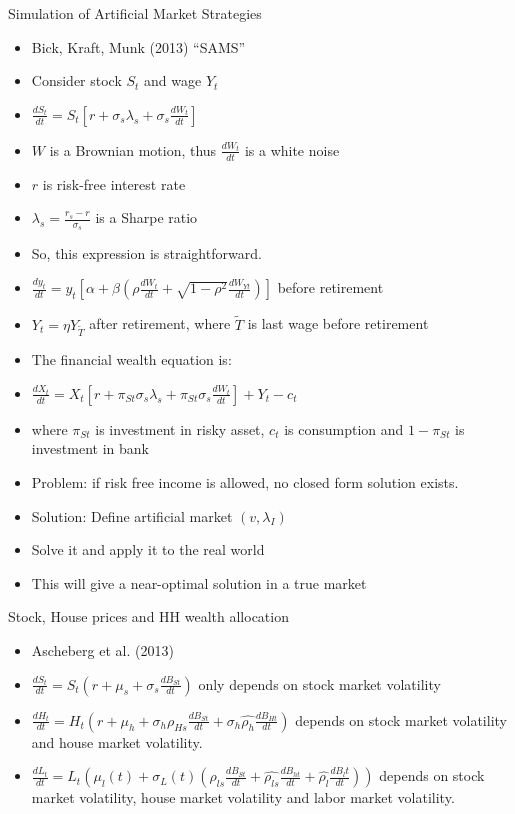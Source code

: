 \documentclass{beamer}
\begin{document}
\begin{frame}[allowframebreaks]{Simulation of Artificial Market Strategies}
  \begin{itemize}
    \item Bick, Kraft, Munk (2013) ``SAMS''
    \item Consider stock $S_t$ and wage $Y_t$
    \item $\frac{dS_t}{dt} = S_t[r+\sigma_s\lambda_s+\sigma_s\frac{dW_t}{dt}]$
    \item $W$ is a Brownian motion, thus $\frac{dW_t}{dt}$ is a white noise
    \item $r$ is risk-free interest rate
    \item $\lambda_s = \frac{r_s - r}{\sigma_s}$ is a Sharpe ratio
    \item So, this expression is straightforward.

\framebreak

    \item $\frac{dy_t}{dt} = y_t[\alpha + \beta (\rho \frac{dW_t}{dt} + \sqrt{1-\rho^2}\frac{dW_{Yt}}{dt})]$ before retirement
    \item $Y_t = \eta Y_{\tilde{T}}$ after retirement, where $\tilde{T}$ is last wage before retirement
    \item The financial wealth equation is:
    \item $\frac{dX_t}{dt} = X_t[r+\pi_{St}\sigma_s\lambda_s + \pi_{St}\sigma_s\frac{dW_t}{dt}] + Y_t - c_t$
    \item where $\pi_{St}$ is investment in risky asset, $c_t$ is consumption and $1-\pi_{St}$ is investment in bank
    \item Problem: if risk free income is allowed, no closed form solution exists.

\framebreak

    \item Solution: Define artificial market $(v, \lambda_I)$
    \item Solve it and apply it to the real world
    \item This will give a near-optimal solution in a true market
  \end{itemize}
\end{frame}%


\begin{frame}[allowframebreaks]{Stock, House prices and HH wealth allocation}
  \begin{itemize}
    \item Ascheberg et al. (2013)
    \item $\frac{dS_t}{dt} = S_t(r+\mu_s + \sigma_s \frac{dB_{St}}{dt})$ only depends on stock market volatility
    \item $\frac{dH_t}{dt} = H_t(r+\mu_h +\sigma_h\rho_{Hs}\frac{dB_{St}}{dt} + \sigma_h\hat{\rho_h}\frac{dB_{Ht}}{dt})$ depends on stock market volatility and house market volatility.
    \item $\frac{dL_t}{dt} = L_t(\mu_l(t) + \sigma_L(t)(\rho_{ls}\frac{dB_{St}}{dt} + \hat{\rho_{ls}}\frac{dB_{ht}}{dt} + \hat{\rho_l}\frac{dB_lt}{dt}))$ depends on stock market volatility, house market volatility and labor market volatility.
  \end{itemize}
\end{frame}
\end{document}
